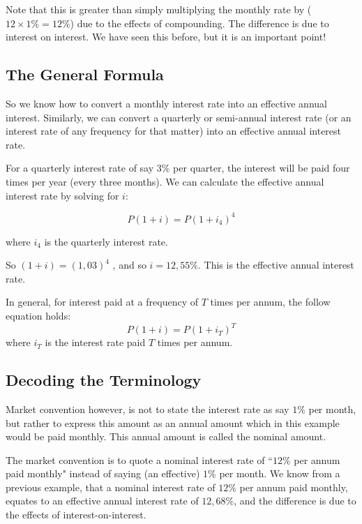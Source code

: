 Note that this is greater than simply multiplying the monthly rate by ($12 \times 1\% = 12\%$) due to the effects of compounding. The difference is due to interest on interest. We have seen this before, but it is an important point!

\subsection{The General Formula}
So we know how to convert a monthly interest rate into an effective annual interest. Similarly, we can convert a quarterly or semi-annual interest rate (or an interest rate of any frequency for that matter) into an effective annual interest rate.

For a quarterly interest rate of say $3\%$ per quarter, the interest will be paid four times per year (every three months). We can calculate the effective annual interest rate by solving for $i$:

\begin{equation*}
P(1 + i ) = P(1 + i_4 )^4
\end{equation*}

where $i_4$ is the quarterly interest rate.

So
$(1 + i ) = (1,03 )^4$ , and so $i = 12,55\%$. This is the effective annual interest rate.

In general, for interest paid at a frequency of $T$ times per annum, the follow equation holds:
\begin{equation}
P(1 + i) = P(1 + i_T)^{T}
\end{equation}
where $i_T$ is the interest rate paid $T$ times per annum.

\subsection{Decoding the Terminology}
Market convention however, is not to state the interest rate as say $1\%$ per month, but rather to express this amount as an annual amount which in this example would be paid monthly. This annual amount is called the nominal amount.

The market convention is to quote a nominal interest rate of ``$12\%$ per annum paid monthly" instead of saying (an effective) $1\%$ per month. We know from a previous example, that a nominal interest rate of $12\%$ per annum paid monthly, equates to an effective annual interest rate of $12,68\%$, and the difference is due to the effects of interest-on-interest.

